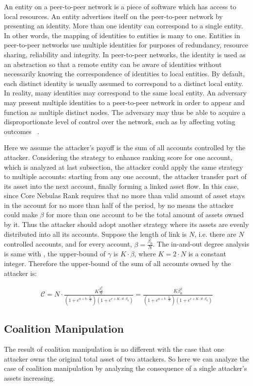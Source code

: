 An entity on a peer-to-peer network is a piece of software which has access to local resources. An entity advertises itself on the peer-to-peer network by presenting an identity. More than one identity can correspond to a single entity. In other words, the mapping of identities to entities is many to one. Entities in peer-to-peer networks use multiple identities for purposes of redundancy, resource sharing, reliability and integrity. In peer-to-peer networks, the identity is used as an abstraction so that a remote entity can be aware of identities without necessarily knowing the correspondence of identities to local entities. By default, each distinct identity is usually assumed to correspond to a distinct local entity. In reality, many identities may correspond to the same local entity. An adversary may present multiple identities to a peer-to-peer network in order to appear and function as multiple distinct nodes. The adversary may thus be able to acquire a disproportionate level of control over the network, such as by affecting voting outcomes ~\cite{wiki:sybil}.

Here we assume the attacker's payoff is the sum of all accounts controlled by the attacker. Considering the strategy to enhance ranking score for one account, which is analyzed at last subsection, the attacker could apply the same strategy to multiple accounts: starting from any one account, the attacker transfer part of its asset into the next account, finally forming a linked asset flow. In this case, since Core Nebulas Rank requires that no more than valid amount of asset stays in the account for no more than half of the period, by no means the attacker could make $\beta$ for more than one account to be the total amount of assets owned by it. Thus the attacker should adopt another strategy where its assets are evenly distributed into all its accounts. Suppose the length of link is $N$, i.e. there are $N$ controlled accounts, and for every account, $\beta = \frac{\beta_0}{N}$. The in-and-out degree analysis is same with , the upper-bound of $\gamma$ is $K \cdot \beta$, where $K=2\cdot N$ is a constant integer. Therefore the upper-bound of the sum of all accounts owned by the attacker is:

\begin{align}
\mathcal{C} = N \cdot \frac{K \frac{\beta_0 ^2}{N}}{ (1+e^{a + b \cdot \frac{\beta_0}{N} }) (1+e^{c + K \cdot d \cdot \beta_0})} = \frac{K \beta_0 ^2 }{ (1+e^{a + b \cdot \frac{\beta_0}{N} }) (1+e^{c + K \cdot d \cdot \beta_0})} 
\end{align}


\subsection{Coalition Manipulation \label{sec:coalition}}
The result of coalition manipulation is no different with the case that one attacker owns the original total asset of two attackers. So here we can analyze the case of coalition manipulation by analyzing the consequence of a single attacker's assets increasing.



